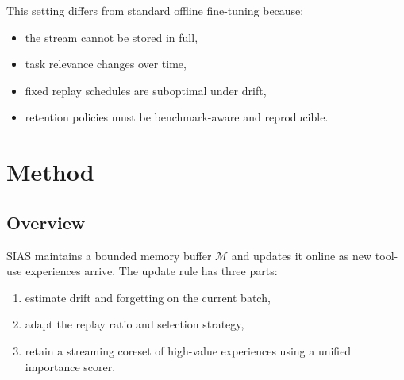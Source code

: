 \documentclass{article}
\begin{document}
This setting differs from standard offline fine-tuning because:
\begin{itemize}[leftmargin=12pt]
    \item the stream cannot be stored in full,
    \item task relevance changes over time,
    \item fixed replay schedules are suboptimal under drift,
    \item retention policies must be benchmark-aware and reproducible.
\end{itemize}

\section{Method}

\subsection{Overview}

SIAS maintains a bounded memory buffer $\mathcal{M}$ and updates it online as new tool-use experiences arrive. The update rule has three parts:
\begin{enumerate}[leftmargin=14pt]
    \item estimate drift and forgetting on the current batch,
    \item adapt the replay ratio and selection strategy,
    \item retain a streaming coreset of high-value experiences using a unified importance scorer.
\end{enumerate}
\end{document}
